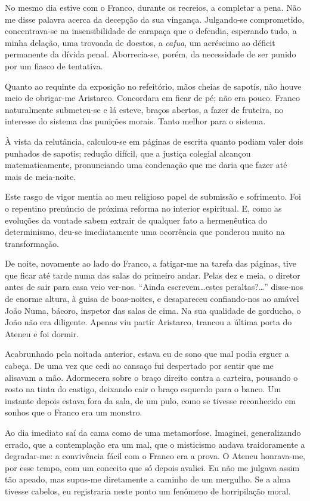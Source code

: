 No mesmo dia estive com o Franco, durante os recreios, a completar a pena.
Não me disse palavra acerca da decepção da sua vingança. Julgando{}-se
comprometido, concentrava{}-se na insensibilidade de carapaça que o
defendia, esperando tudo, a minha delação, uma trovoada de doestos, a
\textit{cafua}, um acréscimo ao déficit permanente da dívida penal.
Aborrecia{}-se, porém, da necessidade de ser punido por um fiasco de tentativa. 

Quanto ao requinte da exposição no refeitório, mãos cheias
de sapotis, não houve meio de obrigar{}-me Aristarco. Concordara em ficar
de pé; não era pouco. Franco naturalmente submeteu{}-se e lá esteve,
braços abertos, a fazer de fruteira, no interesse do sistema das
punições morais. Tanto melhor para o sistema. 

À vista da relutância,
calculou{}-se em páginas de escrita quanto podiam valer dois punhados
de sapotis; redução difícil, que a justiça colegial alcançou
matematicamente, pronunciando uma condenação que me daria que fazer até
mais de meia{}-noite. 

Este rasgo de vigor mentia ao meu religioso papel
de submissão e sofrimento. Foi o repentino prenúncio de próxima reforma
no interior espiritual. E, como as evoluções da vontade sabem extrair
de qualquer fato a hermenêutica do determinismo, deu{}-se imediatamente
uma ocorrência que ponderou muito na transformação. 

De noite, novamente
ao lado do Franco, a fatigar{}-me na tarefa das páginas, tive que ficar
até tarde numa das salas do primeiro andar. Pelas dez e meia, o diretor
antes de sair para casa veio ver{}-nos. ``Ainda escrevem\ldots estes
peraltas?\ldots'' disse{}-nos de enorme altura, à guisa de boas{}-noites, e
desapareceu confiando{}-nos ao amável João Numa, bácoro, inspetor das
salas de cima. Na sua qualidade de gorducho, o João não era diligente.
Apenas viu partir Aristarco, trancou a última porta do 
Ateneu e foi dormir. 

Acabrunhado pela noitada anterior, estava eu de sono que mal
podia erguer a cabeça. De uma vez que cedi ao cansaço fui despertado
por sentir que me alisavam a mão. Adormecera sobre o braço direito
contra a carteira, pousando o rosto na tinta do castigo, deixando cair
o braço esquerdo para o banco. Um instante depois estava fora da sala,
de um pulo, como se tivesse reconhecido em sonhos que o Franco era um
monstro. 

Ao dia imediato saí da cama como de uma metamorfose. Imaginei,
generalizando errado, que a contemplação era um mal, que o misticismo
andava traidoramente a degradar{}-me: a convivência fácil com o Franco 
era a prova. O Ateneu honrava{}-me, por esse tempo,
com um conceito que só depois avaliei. Eu não me julgava assim tão
apeado, mas supus{}-me diretamente a caminho de um mergulho. Se a alma
tivesse cabelos, eu registraria neste ponto um fenômeno de horripilação
moral. 

